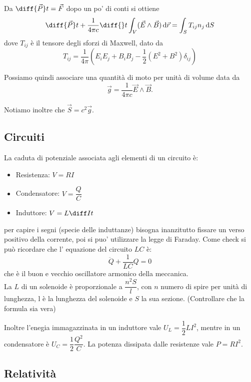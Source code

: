 \documentclass[a4paper,10pt,oneside]{math_article}
\begin{document}
			Da $\diff {\vec P}t = \vec F$  dopo un po' di conti si ottiene 
			\begin{equation}
					\diff {\vec P}t + \frac1{4\pi c}\diff{}t \int_V (\vec E \wedge \vec B) \de\vec r = \int_S T_{ij}n_j \de S
			\end{equation}
			dove $T_{ij}$ è il tensore degli sforzi di Maxwell, dato da 
			\begin{equation}
				T_{ij} = \frac1{4\pi} \left(E_iE_j+B_iB_j - \frac12 (E^2 + B^2) \delta_{ij}\right)
			\end{equation}
			
			Possiamo quindi associare una quantità di moto per unità di volume data da 
			\begin{equation}
				\vec g = \frac1{4	\pi c} \vec E \wedge \vec B.
			\end{equation}
			
			Notiamo inoltre che $\vec S = c^2 \vec g$.			

		\subsection{Circuiti}
			La caduta di potenziale associata agli elementi di un circuito è:
			\begin{itemize}
			 \item Resistenza: $V=RI$
			 \item Condensatore: $V=\dfrac QC$
			 \item Induttore: $V=L\diff It$
			\end{itemize}
			per capire i segni (specie delle induttanze) bisogna inanzitutto fissare un verso positivo della corrente, poi si puo' utilizzare la legge di Faraday. Come check si può ricordare che l' equazione del circuito $LC$ è:
			\begin{equation}
				\ddot{Q}+\frac{1}{LC}Q=0
			\end{equation}
			che è il buon e vecchio oscillatore armonico della meccanica.\\			
			La $L$ di un solenoide è proporzionale a $\dfrac{n^2S}{l}$, con $n$ numero di spire per unità di lunghezza, l è la lunghezza del solenoide e $S$ la sua sezione. (Controllare che la formula sia vera)
			
			Inoltre l'enegia immagazzinata in un induttore vale $U_L=\dfrac12 LI^2$, mentre in un condensatore è $U_C=\dfrac12 \dfrac{Q^2}C$. La potenza dissipata dalle resistenze vale $P=RI^2$. 

		\subsection{Relatività}
					
\end{document}
